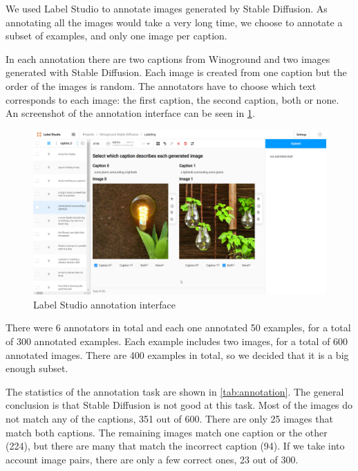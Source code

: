 We used Label Studio \cite{labelstudio} to annotate images generated by Stable Diffusion. As annotating all the images would take a very long time, we choose to annotate a subset of examples, and only one image per caption. 

In each annotation there are two captions from Winoground and two images generated with Stable Diffusion. Each image is created from one caption but the order of the images is random. The annotators have to choose which text corresponds to each image: the first caption, the second caption, both or none. An screenshot of the annotation interface can be seen in \cref{fig:label-studio-annotation}.

\begin{figure}[ht]
    \centering
    \includegraphics[width=\linewidth]{images/annotation/label-studio-annotation.png}
    \caption{Label Studio annotation interface}
    \label{fig:label-studio-annotation}
\end{figure}

There were 6 annotators in total and each one annotated 50 examples, for a total of 300 annotated examples. Each example includes two images, for a total of 600 annotated images. There are 400 examples in total, so we decided that it is a big enough subset.

The statistics of the annotation task are shown in \cref{tab:annotation}. The general conclusion is that Stable Diffusion is not good at this task. Most of the images do not match any of the captions, 351 out of 600. There are only 25 images that match both captions. The remaining images match one caption or the other (224), but there are many that match the incorrect caption (94). If we take into account image pairs, there are only a few correct ones, 23 out of 300.


